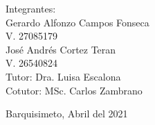 \begin{titlepage}
\begin{table}[t]
\begin{flushright}
Integrantes:\\


Gerardo Alfonzo Campos Fonseca\\
V. 27085179\\
José Andrés Cortez Teran\\
V. 26540824\\

\vspace*{2mm}
Tutor: Dra. Luisa Escalona\\
Cotutor: MSc. Carlos Zambrano\\

\end{flushright}
\vspace*{5mm}

\begin{center}Barquisimeto, Abril del 2021\end{center}
\end{table}
\end{titlepage}

